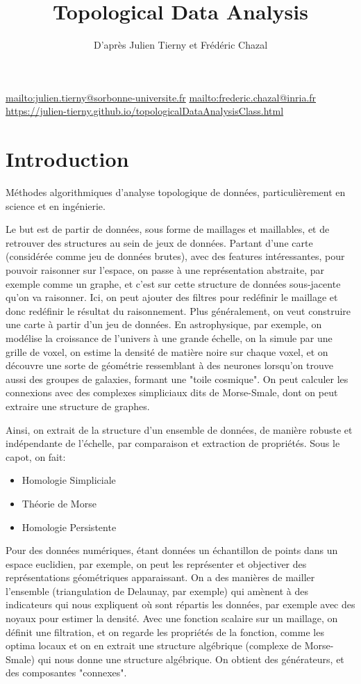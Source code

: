 \documentclass[info, math]{mpb-cours}
\title{Topological Data Analysis}
\author{D'après Julien Tierny et Frédéric Chazal}
\begin{document}
\bettertitle
\url{mailto:julien.tierny@sorbonne-universite.fr}
\url{mailto:frederic.chazal@inria.fr}
\url{https://julien-tierny.github.io/topologicalDataAnalysisClass.html}

\section*{Introduction}
Méthodes algorithmiques d'analyse topologique de données, particulièrement en science et en ingénierie.

Le but est de partir de données, sous forme de maillages et maillables, et de retrouver des
structures au sein de jeux de données.
Partant d'une carte (considérée comme jeu de données brutes), avec des features intéressantes,
pour pouvoir raisonner sur l'espace, on passe à une représentation abstraite, par exemple
comme un graphe, et c'est sur cette structure de données sous-jacente qu'on va raisonner.
Ici, on peut ajouter des filtres pour redéfinir le maillage et donc redéfinir le résultat
du raisonnement.
Plus généralement, on veut construire une carte à partir d'un jeu de données.
En astrophysique, par exemple, on modélise la croissance de l'univers à une grande échelle, on
la simule par une grille de voxel, on estime la densité de matière noire sur chaque voxel,
et on découvre une sorte de géométrie ressemblant à des neurones lorsqu'on trouve aussi des groupes
de galaxies, formant une "toile cosmique".
On peut calculer les connexions avec des complexes simpliciaux dits de Morse-Smale, dont on peut extraire
une structure de graphes.

Ainsi, on extrait de la structure d'un ensemble de données, de manière robuste et indépendante de l'échelle, par comparaison et extraction de propriétés.
Sous le capot, on fait:
\begin{itemize}
	\item Homologie Simpliciale
	\item Théorie de Morse
	\item Homologie Persistente
\end{itemize}

Pour des données numériques, étant données un échantillon de points dans un espace euclidien, par exemple, on peut les représenter et objectiver des représentations géométriques apparaissant.
On a des manières de mailler l'ensemble (triangulation de Delaunay, par exemple) qui amènent à des
indicateurs qui nous expliquent où sont répartis les données, par exemple avec des noyaux pour estimer la
densité.
Avec une fonction scalaire sur un maillage, on définit une filtration, et on regarde les propriétés de la fonction, comme les optima locaux et on en extrait une structure algébrique (complexe de Morse-Smale) qui nous donne une structure algébrique.
On obtient des générateurs, et des composantes "connexes".
\end{document}
